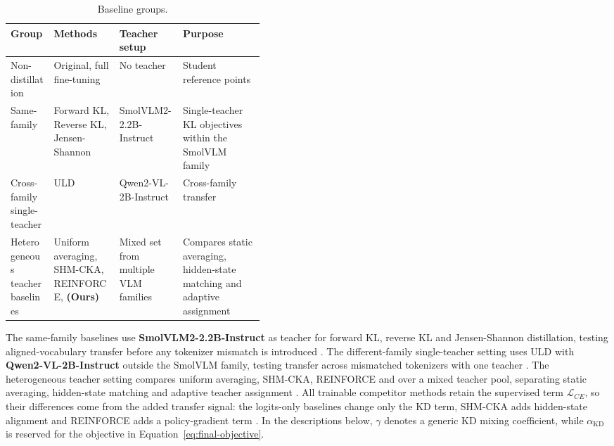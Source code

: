 \begin{table}[tp]
\centering
\caption[Baseline groups.]{Baseline groups.}
\label{tab:baseline-groups}
\footnotesize
\setlength{\tabcolsep}{4pt}
\renewcommand{\arraystretch}{1.25}
\begin{tabularx}{\linewidth}{@{}
  >{\raggedright\arraybackslash}p{0.17\linewidth}
  >{\raggedright\arraybackslash}X
  >{\raggedright\arraybackslash}p{0.25\linewidth}
  >{\raggedright\arraybackslash}X@{}}
\toprule
\textbf{Group} & \textbf{Methods} & \textbf{Teacher setup} & \textbf{Purpose} \\
\midrule
Non-distillation
  & Original, full fine-tuning
  & No teacher
  & Student reference points \\[3pt]
Same-family
  & Forward KL, Reverse KL, Jensen-Shannon
  & \mbox{SmolVLM2-2.2B-Instruct}
  & Single-teacher KL objectives within the SmolVLM family \\[3pt]
Cross-family single-teacher
  & ULD
  & \mbox{Qwen2-VL-2B-Instruct}
  & Cross-family transfer \\[3pt]
Heterogeneous teacher baselines
  & Uniform averaging, SHM-CKA, REINFORCE, \textbf{\methodname{} (Ours)}
  & Mixed set from multiple VLM families
  & Compares static averaging, hidden-state matching and adaptive assignment \\
\bottomrule
\end{tabularx}
\end{table}


The same-family baselines use \textbf{SmolVLM2-2.2B-Instruct} as teacher for
forward KL, reverse KL and Jensen-Shannon distillation, testing aligned-vocabulary
transfer before any tokenizer mismatch is introduced
\cite{hinton2015distillingknowledgeneuralnetwork,lin1991jensen,cui2024sinkhorn}.
The different-family single-teacher setting uses ULD with
\textbf{Qwen2-VL-2B-Instruct} outside the SmolVLM family, testing transfer across mismatched tokenizers with one
teacher \cite{boizard2024towardscrosstokenizerdistillation}. The heterogeneous
teacher setting compares uniform averaging, SHM-CKA, REINFORCE and
\methodname{} over a mixed teacher pool, separating static averaging,
hidden-state matching and adaptive teacher assignment
\cite{takezawa2021supervisedtreewasserstein,zhang2023adaptivemultiteachermetalearning,yu2024selectdistill,dasgupta2025improving}. All trainable competitor methods retain the supervised term
\(\mathcal{L}_{CE}\), so their differences come from the added transfer signal:
the logits-only baselines change only the KD term, SHM-CKA adds hidden-state
alignment and REINFORCE adds a policy-gradient term
\cite{kornblith2019similarityrepresentations,williams1992simple,yuan2020reinforcedmultiteacherselection}.
In the descriptions below, \(\gamma\) denotes a generic KD mixing coefficient,
while \(\alpha_{\mathrm{KD}}\) is reserved for the \methodname{} objective in
Equation~\ref{eq:final-objective}.

